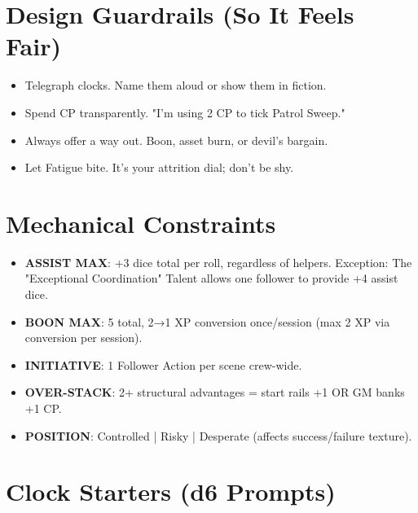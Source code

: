 \section{Design Guardrails (So It Feels Fair)}

\begin{itemize}
\item Telegraph clocks. Name them aloud or show them in fiction.
\item Spend CP transparently. "I'm using 2 CP to tick Patrol Sweep."
\item Always offer a way out. Boon, asset burn, or devil's bargain.
\item Let Fatigue bite. It's your attrition dial; don't be shy.
\end{itemize}

\section{Mechanical Constraints}
\begin{itemize}
    \item \textbf{ASSIST MAX}: +3 dice total per roll, regardless of helpers. Exception: The "Exceptional Coordination" Talent allows one follower to provide +4 assist dice.
    \item \textbf{BOON MAX}: 5 total, 2→1 XP conversion once/session (max 2 XP via conversion per session).
    \item \textbf{INITIATIVE}: 1 Follower Action per scene crew-wide.
    \item \textbf{OVER-STACK}: 2+ structural advantages = start rails +1 OR GM banks +1 CP.
    \item \textbf{POSITION}: Controlled | Risky | Desperate (affects success/failure texture).
\end{itemize}

\section{Clock Starters (d6 Prompts)}

